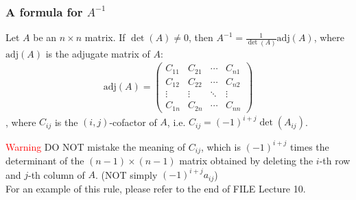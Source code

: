 \documentclass[10pt, a4paper]{article}
\begin{document}
\subsubsection*{A formula for $A^{-1}$}
\begin{proposition}
    Let $A$ be an $n\times n$ matrix. If $\det(A)\neq 0$, then $A^{-1} = \frac{1}{\det(A)}\text{adj}(A)$, where $\text{adj}(A)$ is the adjugate matrix of $A$:
    \begin{align*}
        \text{adj}(A) = \begin{pmatrix}
            C_{11} & C_{21} & \cdots & C_{n1} \\
            C_{12} & C_{22} & \cdots & C_{n2} \\
            \vdots & \vdots & \ddots & \vdots \\
            C_{1n} & C_{2n} & \cdots & C_{nn}
        \end{pmatrix}
    \end{align*}, where $C_{ij}$ is the $(i,j)$-cofactor of $A$, i.e. $C_{ij} = (-1)^{i+j}\det(A_{ij})$. 
\end{proposition}
\indent\textcolor{red}{Warning} DO NOT mistake the meaning of $C_{ij}$, which is $(-1)^{i+j}$ times the determinant of the $(n-1)\times (n-1)$ matrix obtained by deleting the $i$-th row and $j$-th column of $A$. (NOT simply $(-1)^{i+j}a_{ij}$)\\
\indent For an example of this rule, please refer to the end of FILE Lecture 10.
\end{document}
